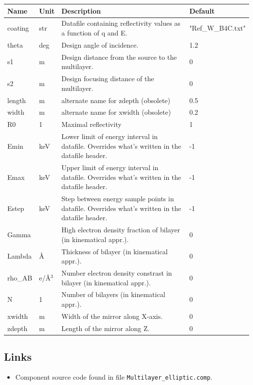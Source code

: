 \begin{longtable}{p{}p{}p{}p{}}
\toprule
\textbf{Name} & \textbf{Unit} & \textbf{Description} & \textbf{Default} \\
\midrule
\endhead
coating & str & Datafile containing reflectivity values as a function of q and E. & "Ref\_W\_B4C.txt" \\
theta & deg & Design angle of incidence. & 1.2 \\
s1 & m & Design distance from the source to the multilayer. & 0 \\
s2 & m & Design focusing distance of the multilayer. & 0 \\
length & m & alternate name for zdepth (obsolete) & 0.5 \\
width & m & alternate name for xwidth (obsolete) & 0.2 \\
R0 & 1 & Maximal reflectivity & 1 \\
Emin & keV & Lower limit of energy interval in datafile. Overrides what's written in the datafile header. & -1 \\
Emax & keV & Upper limit of energy interval in datafile. Overrides what's written in the datafile header. & -1 \\
Estep & keV & Step between energy sample points in datafile. Overrides what's written in the datafile header. & -1 \\
Gamma &   & High electron density fraction of bilayer (in kinematical appr.). & 0 \\
Lambda & \AA{} & Thickness of bilayer (in kinematical appr.). & 0 \\
rho\_AB & e/\AA{}$^{3}$ & Number electron density constrast in bilayer (in kinematical appr.). & 0 \\
N & 1 & Number of bilayers (in kinematical appr.). & 0 \\
xwidth & m & Width of the mirror along X-axis. & 0 \\
zdepth & m & Length of the mirror along Z. & 0 \\
\bottomrule
\end{longtable}

\subsection*{Links}
\begin{itemize}
  \item Component source code found in file \texttt{Multilayer\_elliptic.comp}.
\end{itemize}
